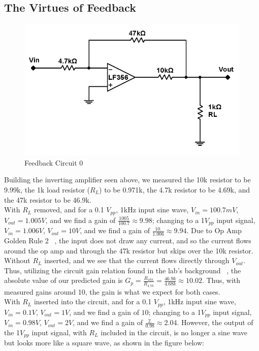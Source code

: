 \documentclass{article}
\begin{document}
\subsection{The Virtues of Feedback}
    \begin{figure}[H]
        \centering
        \includegraphics[scale = 0.5]{6.png}
        \caption{Feedback Circuit 0 ~\cite{webfig}}
        \label{fig:my_label}
    \end{figure}
    Building the inverting amplifier seen above, we measured the 10k resistor to be 9.99k, the 1k load resistor ($R_L$) to be 0.971k, the 4.7k resistor to be 4.69k, and the 47k resistor to be 46.9k.\\\indent With $R_L$ removed, and for a 0.1 $V_{pp}$, 1kHz input sine wave, $V_{in} = 100.7 mV$, $V_{out} = 1.005 V$, and we find a gain of $\frac{1005}{100.7} \approx 9.98$; changing to a 1$V_{pp}$ input signal, $V_{in} = 1.006 V$, $V_{out} = 10 V$, and we find a gain of $\frac{10.}{1.006} \approx 9.94$. Due to Op Amp Golden Rule 2 ~\cite{webfig}, the input does not draw any current, and so the current flows around the op amp and through the 47k resistor but skips over the 10k resistor. Without $R_L$ inserted, and we see that the current flows directly through $V_{out}$. Thus, utilizing the circuit gain relation found in the lab's background ~\cite{webfig}, the absolute value of our predicted gain is $G_p = \frac{R_{47k}}{R_{4.7k}} = \frac{46.9k}{4.68k} \approx 10.02$. Thus, with measured gains around 10, the gain is what we expect for both cases.
    \\\indent With $R_L$ inserted into the circuit, and for a 0.1 $V_{pp}$, 1kHz input sine wave, $V_{in} = 0.1 V$, $V_{out} = 1 V$, and we find a gain of $10$; changing to a 1$V_{pp}$ input signal, $V_{in} = 0.98 V$, $V_{out} = 2 V$, and we find a gain of $\frac{2.}{0.98} \approx 2.04$. However, the output of the 1$V_{pp}$ input signal, with $R_L$ included in the circuit, is no longer a sine wave but looks more like a square wave, as shown in the figure below:
\end{document}
